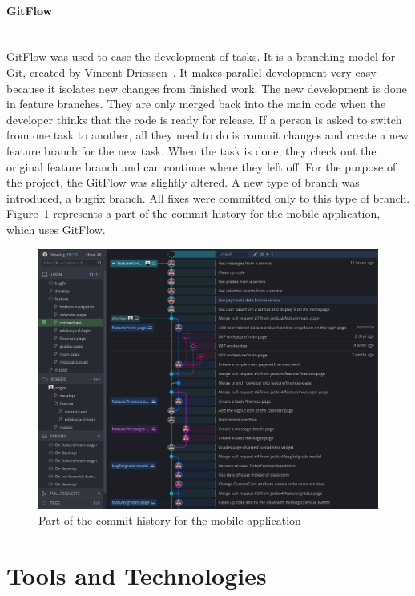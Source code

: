 \paragraph{\large{GitFlow}}\mbox{}\\[2pt]
GitFlow was used to ease the development of tasks. It is a branching model for Git, created by Vincent Driessen~\cite{gitflow}. It makes parallel development very easy because it isolates new changes from finished work. The new development is done in feature branches. They are only merged back into the main code when the developer thinks that the code is ready for release. If a person is asked to switch from one task to another, all they need to do is commit changes and create a new feature branch for the new task. When the task is done, they check out the original feature branch and can continue where they left off.
For the purpose of the project, the GitFlow was slightly altered. A new type of branch was introduced, a bugfix branch. All fixes were committed only to this type of branch. Figure~\ref{fig:gitflow} represents a part of the commit history for the mobile application, which uses GitFlow.

\begin{figure}[htb]
    \centering
    \includegraphics[width=\textwidth]{fig04/gitflow.png}
    \caption{Part of the commit history for the mobile application} \label{fig:gitflow}
\end{figure}

\section{Tools and Technologies}
